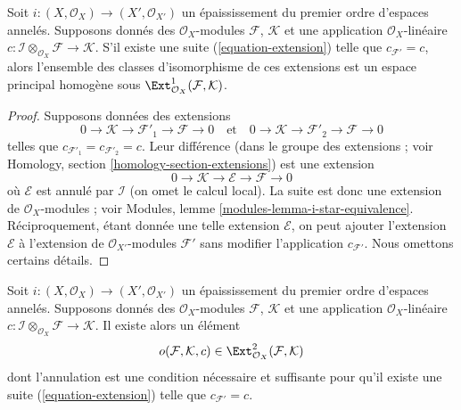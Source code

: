 \begin{lemma}
\label{lemma-inf-ext}
Soit $i : (X, \mathcal{O}_X) \to (X', \mathcal{O}_{X'})$ un épaississement
du premier ordre d'espaces annelés.
Supposons donnés des $\mathcal{O}_X$-modules $\mathcal{F}$, $\mathcal{K}$
et une application $\mathcal{O}_X$-linéaire
$c : \mathcal{I} \otimes_{\mathcal{O}_X} \mathcal{F} \to \mathcal{K}$.
S'il existe une suite (\ref{equation-extension}) telle que
$c_{\mathcal{F}'} = c$, alors l'ensemble des classes d'isomorphisme de ces
extensions est un espace principal homogène sous
$\Ext^1_{\mathcal{O}_X}(\mathcal{F}, \mathcal{K})$.
\end{lemma}

\begin{proof}
Supposons données des extensions
$$
0 \to \mathcal{K} \to \mathcal{F}'_1 \to \mathcal{F} \to 0
\quad\text{et}\quad
0 \to \mathcal{K} \to \mathcal{F}'_2 \to \mathcal{F} \to 0
$$
telles que $c_{\mathcal{F}'_1} = c_{\mathcal{F}'_2} = c$. Leur différence
(dans le groupe des extensions ; voir
Homology, section \ref{homology-section-extensions})
est une extension
$$
0 \to \mathcal{K} \to \mathcal{E} \to \mathcal{F} \to 0
$$
où $\mathcal{E}$ est annulé par $\mathcal{I}$ (on omet le calcul local).
La suite est donc une extension de $\mathcal{O}_X$-modules ;
voir Modules, lemme \ref{modules-lemma-i-star-equivalence}.
Réciproquement, étant donnée une telle extension $\mathcal{E}$, on peut ajouter l'extension
$\mathcal{E}$ à l'extension de $\mathcal{O}_{X'}$-modules $\mathcal{F}'$ sans
modifier l'application $c_{\mathcal{F}'}$. Nous omettons certains détails.
\end{proof}

\begin{lemma}
\label{lemma-inf-obs-ext}
Soit $i : (X, \mathcal{O}_X) \to (X', \mathcal{O}_{X'})$
un épaississement du premier ordre d'espaces annelés. Supposons donnés des
$\mathcal{O}_X$-modules $\mathcal{F}$, $\mathcal{K}$
et une application $\mathcal{O}_X$-linéaire
$c : \mathcal{I} \otimes_{\mathcal{O}_X} \mathcal{F} \to \mathcal{K}$.
Il existe alors un élément
$$
o(\mathcal{F}, \mathcal{K}, c) \in
\Ext^2_{\mathcal{O}_X}(\mathcal{F}, \mathcal{K})
$$
dont l'annulation est une condition nécessaire et suffisante pour qu'il existe
une suite (\ref{equation-extension}) telle que $c_{\mathcal{F}'} = c$.
\end{lemma}

